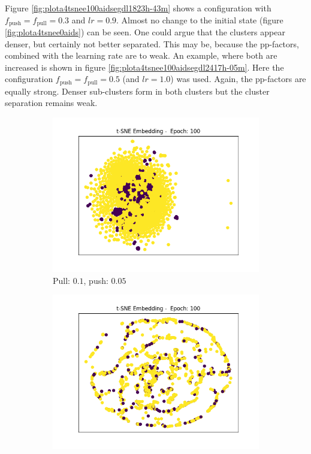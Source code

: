 		Figure \ref{fig:plota4tsnee100aidsegdl1823h-43m} shows a configuration with $f_{\text{push}}=f_{\text{pull}}=0.3$ and $lr=0.9$.
		Almost no change to the initial state (figure \ref{fig:plota4tsnee0aids}) can be seen.
		One could argue that the clusters appear denser, but certainly not better separated.
		This may be, because the pp-factors, combined with the learning rate are to weak. 
		An example, where both are increased is shown in figure \ref{fig:plota4tsnee100aidsegdl2417h-05m}.
		Here the configuration $f_{\text{push}}=f_{\text{pull}}=0.5$ (and $lr=1.0$) was used.
		Again, the pp-factors are equally strong.
		Denser sub-clusters form in both clusters but the cluster separation remains weak.
		
		\begin{figure}[H]
			\centering
			\begin{subfigure}{0.49\textwidth}
				\centering
				\includegraphics[width=1.1\linewidth]{images/plotA4_tSNE_e100_AIDS_E_GDL_24_12h-29m} %
				\caption{Pull: $0.1$, push: $0.05$}
				\label{fig:plota4tsnee100aidsegdl2412h-29m}
			\end{subfigure}
			\begin{subfigure}{0.49\textwidth}
				\centering
				\includegraphics[width=1.1\linewidth]{images/plotA4_tSNE_e100_AIDS_E_GDL_24_13h-38m} %

\end{subfigure}
\end{figure}
